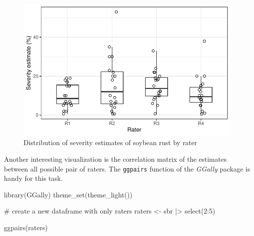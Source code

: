 \documentclass[
  letterpaper,
  DIV=11,
  numbers=noendperiod]{scrreprt}
\newenvironment{Shaded}{\begin{snugshade}}{\end{snugshade}}
\newcommand{\CommentTok}[1]{\textcolor[rgb]{0.37,0.37,0.37}{#1}}
\newcommand{\DecValTok}[1]{\textcolor[rgb]{0.68,0.00,0.00}{#1}}
\newcommand{\FunctionTok}[1]{\textcolor[rgb]{0.28,0.35,0.67}{#1}}
\newcommand{\NormalTok}[1]{\textcolor[rgb]{0.00,0.23,0.31}{#1}}
\newcommand{\OtherTok}[1]{\textcolor[rgb]{0.00,0.23,0.31}{#1}}
\newcommand{\SpecialCharTok}[1]{\textcolor[rgb]{0.37,0.37,0.37}{#1}}
\begin{document}
\begin{figure}[H]

{\centering \includegraphics{./data-accuracy_files/figure-pdf/fig-raters2-1.pdf}

}

\caption{\label{fig-raters2}Distribution of severity estimates of
soybean rust by rater}

\end{figure}

Another interesting visualization is the correlation matrix of the
estimates between all possible pair of raters. The \texttt{ggpairs}
function of the \emph{GGally} package is handy for this task.

\begin{Shaded}
\begin{Highlighting}[]
\FunctionTok{library}\NormalTok{(GGally)}
\FunctionTok{theme\_set}\NormalTok{(}\FunctionTok{theme\_light}\NormalTok{())}

\CommentTok{\# create a new dataframe with only raters}
\NormalTok{raters }\OtherTok{\textless{}{-}}\NormalTok{ sbr }\SpecialCharTok{|\textgreater{}} 
  \FunctionTok{select}\NormalTok{(}\DecValTok{2}\SpecialCharTok{:}\DecValTok{5}\NormalTok{)}

\FunctionTok{ggpairs}\NormalTok{(raters)}
\end{Highlighting}
\end{Shaded}
\end{document}
